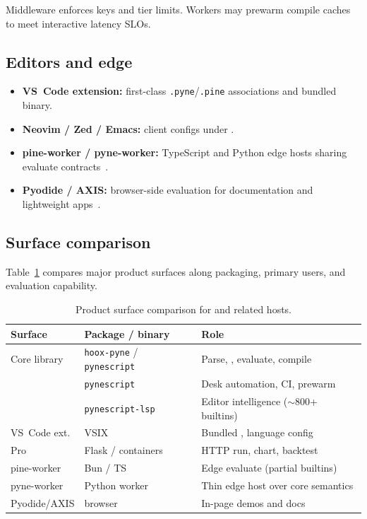 \documentclass[11pt,a4paper]{article}
\begin{document}
Middleware enforces \api{} keys and tier limits.
Workers may prewarm compile caches to meet interactive latency SLOs.

\subsection{Editors and edge}
\label{sec:edge}

\begin{itemize}[leftmargin=1.2em]
  \item \textbf{VS~Code extension:} first-class \texttt{.pyne}/\texttt{.pine}
    associations and bundled \lsp{} binary.
  \item \textbf{Neovim / Zed / Emacs:} client configs under .
  \item \textbf{pine-worker / pyne-worker:} TypeScript and Python edge hosts
    sharing evaluate contracts~\citep{cloudflare-workers}.
  \item \textbf{Pyodide / AXIS:} browser-side evaluation for documentation and
    lightweight apps~\citep{pyodide}.
\end{itemize}

\subsection{Surface comparison}
\label{sec:surface-table}

Table~\ref{tab:surfaces} compares major product surfaces along packaging,
primary users, and evaluation capability.

\begin{table}[t]
\centering
\caption{Product surface comparison for \pyne{} and related hosts.}
\label{tab:surfaces}
\begin{tabular}{@{}llp{4.6cm}@{}}
\toprule
\textbf{Surface} & \textbf{Package / binary} & \textbf{Role} \\
\midrule
Core library & \texttt{hoox-pyne} / \texttt{pynescript} & Parse, \ast{}, evaluate, compile \\
\cli{} & \texttt{pynescript} & Desk automation, CI, prewarm \\
\lsp{} & \texttt{pynescript-lsp} & Editor intelligence ($\sim$800+ builtins) \\
VS~Code ext. & VSIX & Bundled \lsp{}, language config \\
Pro \api{} & Flask / containers & HTTP run, chart, backtest \\
pine-worker & Bun / TS & Edge evaluate (partial builtins) \\
pyne-worker & Python worker & Thin edge host over core semantics \\
Pyodide/AXIS & browser & In-page demos and docs \\
\bottomrule
\end{tabular}
\end{table}
\end{document}
